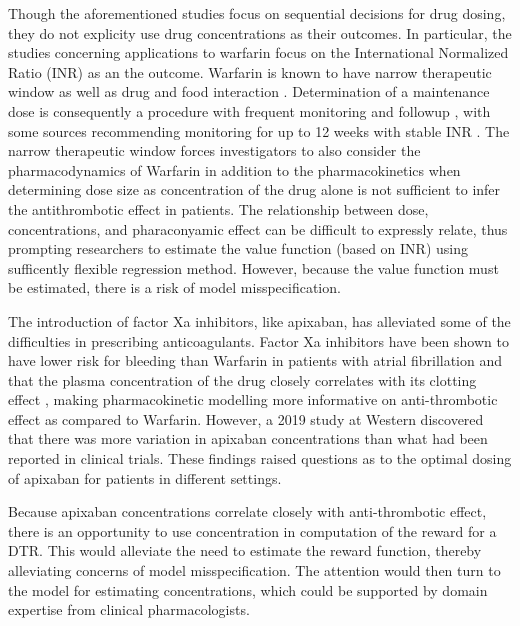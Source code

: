 Though the aforementioned studies focus on sequential decisions for drug dosing, they do not explicity use drug concentrations as their outcomes. In particular, the studies concerning applications to warfarin focus on the International Normalized Ratio (INR) as an the outcome. Warfarin is known to have narrow therapeutic window \cite{merli2009warfarin} as well as drug and food interaction \cite{juurlink2007drug}. Determination of a maintenance dose is consequently a procedure with frequent monitoring and followup \cite{carris2015feasibility}, with some sources recommending monitoring for up to 12 weeks with stable INR \cite{holbrook2012evidence}. The narrow therapeutic window forces investigators to also consider the pharmacodynamics of Warfarin in addition to the pharmacokinetics when determining dose size as concentration of the drug alone is not sufficient to infer the antithrombotic effect in patients. The relationship between dose, concentrations, and pharaconyamic effect can be difficult to expressly relate, thus prompting researchers to estimate the value function (based on INR) using sufficently flexible regression method. However, because the value function must be estimated, there is a risk of model misspecification.

The introduction of factor Xa inhibitors, like apixaban, has alleviated some of the difficulties in prescribing anticoagulants. Factor Xa inhibitors have been shown to have lower risk for bleeding than Warfarin in patients with atrial fibrillation \cite{touma2015meta} and that the plasma concentration of the drug closely correlates with its clotting effect \cite{Byon2019-gf}, making pharmacokinetic modelling more informative on anti-thrombotic effect as compared to Warfarin. However, a 2019 study at Western \cite{sukumar2019apixaban} discovered that there was more variation in apixaban concentrations than what had been reported in clinical trials.  These findings raised questions as to the optimal dosing of apixaban for patients in different settings.

Because apixaban concentrations correlate closely with anti-thrombotic effect, there is an opportunity to use concentration in computation of the reward for a DTR.  This would alleviate the need to estimate the reward function, thereby alleviating concerns of model misspecification.  The attention would then turn to the model for estimating concentrations, which could be supported by domain expertise from clinical pharmacologists.



